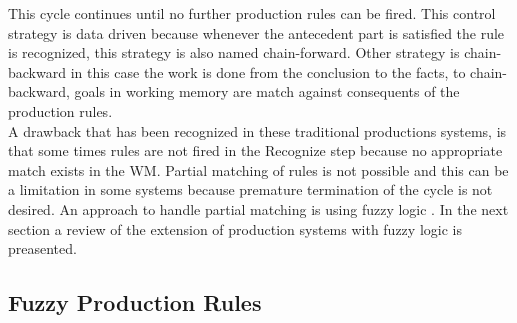 This cycle continues until no further production rules can be fired.
This control strategy is data driven because whenever the antecedent
part is satisfied the rule is recognized, this strategy is also named
chain-forward. Other strategy is chain-backward in this case the work
is done from the conclusion to the facts, to chain-backward, goals in
working memory are match against consequents of the production
rules.\\  A drawback that has been recognized in these traditional
productions systems, is that some times rules are not fired in the
Recognize step because no appropriate match exists in the WM. Partial
matching of rules is not possible and this can be a limitation in some
systems because premature termination of the cycle is not desired. An
approach to handle partial matching is using fuzzy logic
\cite{konar2006computational}. In the next section a review of the
extension of production systems with fuzzy logic is preasented.\\

\subsection{Fuzzy Production Rules}

